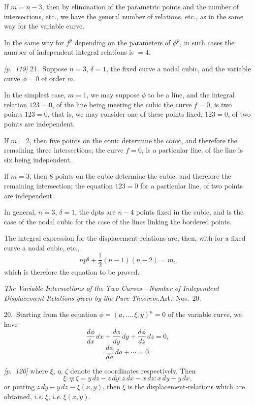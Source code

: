 \documentclass[11pt,a4paper]{book}
\begin{document}
If $m = n - 3$, then by elimination of the parametric points and the number of intersections, etc., we have the general number of relations, etc., as in the same way for the variable curve.

In the same way for $f^p$ depending on the parameters of $\phi^p$, in such cases the number of independent integral relations is $= 4$.

\bigskip\noindent\textit{[p.~119]} 21.\ Suppose $n = 3$, $\delta = 1$, the fixed curve a nodal cubic, and the variable curve $\phi = 0$ of order $m$.

In the simplest case, $m = 1$, we may suppose $\phi$ to be a line, and the integral relation $123 = 0$, of the line being meeting the cubic the curve $f = 0$, is two points $123 = 0$, that is, we may consider one of these points fixed, $123 = 0$, of two points are independent.

If $m = 2$, then five points on the conic determine the conic, and therefore the remaining three intersections; the curve $f = 0$, is a particular line, of the line is six being independent.

If $m = 3$, then 8 points on the cubic determine the cubic, and therefore the remaining intersection; the equation $123 = 0$ for a particular line, of two points are independent.

In general, $n = 3$, $\delta = 1$, the dpts are $n - 4$ points fixed in the cubic, and is the case of the nodal cubic for the case of the lines linking the bordered points.

The integral expression for the displacement-relations are, then, with for a fixed curve a nodal cubic, etc.,
\[
n p^q + \frac{1}{2}(n - 1)(n - 2) = m,
\]
which is therefore the equation to be proved.

\textit{The Variable Intersections of the Two Curves---Number of Independent Displacement Relations given by the Pure Theorem.}\quad Art.\ Nos.~20.

20.\ Starting from the equation $\phi = (a, \ldots, \xi, y)^n = 0$ of the variable curve, we have
\[
\frac{d\phi}{dx}\,dx + \frac{d\phi}{dy}\,dy + \frac{d\phi}{dz}\,dz = 0,
\]
\[
\frac{d\phi}{da}\,da + \cdots = 0.
\]

\bigskip\noindent\textit{[p.~120]} where $\xi$, $\eta$, $\zeta$ denote the coordinates respectively. Then
\[
\xi : \eta : \zeta = y\,dz - z\,dy : z\,dx - x\,dz : x\,dy - y\,dx,
\]
or putting $z\,dy - y\,dz \equiv \xi(x, y)$, then $\xi$ is the displacement-relations which are obtained, $i.e.\ \xi$, $i.e.\ \xi(x, y)$.
\end{document}
